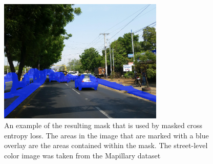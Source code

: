 \begin{figure}
	\centering
	\includegraphics[width=0.7\textwidth]{figures/approach/mask/image/mask.jpg} %
	\caption[Masked Cross Entropy Mask]{An example of the resulting mask that is used by masked cross entropy loss. The areas in the image that are marked with a blue overlay are the areas contained within the mask. The street-level color image was taken from the Mapillary dataset \cite{mapillary}} \label{fig:approach-mask}

\end{figure}